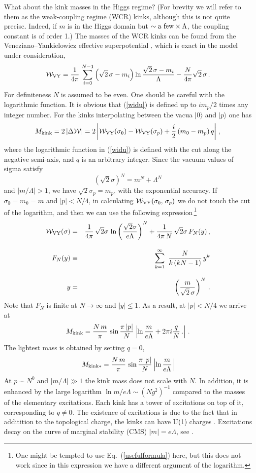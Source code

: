 \documentclass[epsfig,12pt]{article}
\def\beq{\begin{equation}}
\def\eeq{\end{equation}}
\def\beqn{\begin{eqnarray}}
\def\eeqn{\end{eqnarray}}
\newcommand{\cw}{{\mathcal W}}
\def\beqn{\begin{eqnarray}}
\def\eeqn{\end{eqnarray}}
\def\beq{\begin{equation}}
\def\eeq{\end{equation}}
\begin{document}
{What about the kink masses in the Higgs regime? (For brevity we will refer to them as
the weak-coupling regime (WCR) kinks, although this is not quite precise.
Indeed, if $m$ is in the Higgs domain but $\sim {\rm a\,\, few}\times\Lambda$, the coupling constant is 
of order 1.) The masses of the WCR
kinks
can be found from the Veneziano--Yankielowicz
effective superpotential \cite{HaHo},
which is exact in the model under consideration,
\beq
\cw_{\rm VY} 
=
 \frac{1}{4\pi}
\,\sum_{i=0}^{N-1}\left(\sqrt{2}\,\sigma -m_i
\right)\ln\frac{\sqrt{2}\,\sigma -m_i}{\Lambda}-\frac{N}{4\pi}\sqrt{2}\,\sigma\,.
\label{widu}
\eeq
For definiteness $N$ is assumed to be even.
One should be careful with the logarithmic function. It is obvious that (\ref{widu})
is defined up to $im_p/2$ times any integer number.
For the kinks interpolating between the  vacua $|0\rangle$ and  $|p\rangle$  one has \cite{HaHo}
\beq
M_{\rm kink} 
=
 2\left|\Delta \cw\right|= 2\left|\cw_{\rm VY} (\sigma_0) - \cw_{\rm VY} (\sigma_p)+\frac{i}{2}\left(m_0-m_p\right) q  \right|\,,
   \label{widup}
\eeq
where the logarithmic function in (\ref{widu}) is defined with the cut along the negative semi-axis, and $q$ is an arbitrary integer.
Since the vacuum values of sigma satisfy
$$(\sqrt{2}\sigma)^N = m^N + \Lambda^N$$ and $|m/\Lambda| >1$, we 
have $\sqrt{2}\sigma_p = m_p$, with the exponential accuracy.
If  $\sigma_0=m_0=m$ and $|p|<N/4$, in calculating  $\cw_{\rm VY} (\sigma_0, \,\sigma_p)$
we do not touch the cut of the logarithm, and then we can use the following expression\,\footnote{One might be tempted to use Eq.~(\ref{usefulformula}) here, but this does not work
since in this expression we have a different argument of the logarithm.}
\beqn
\cw_{\rm VY}(\sigma)
&=&
  \frac{1}{4\pi}\,\sqrt{2}\sigma\,   \ln\left(\frac{\sqrt{2}\sigma}{e\Lambda}\right)^N
+\frac{1}{4\pi\,N }\,\sqrt{2}\sigma\,F_N(y)\,,
\nonumber\\[3mm]
F_N(y) 
&\equiv&
 \sum_{k=1}^\infty \,\,\frac{N}{k\, (kN-1)}\, y^k
\nonumber\\[3mm]
 y 
&=& 
\left(\frac{m}{\sqrt{2}\,\sigma}\right)^N\,.
\label{chet1}
\eeqn
Note that $F_N$ is finite at $N\to \infty$ and $|y|\leq 1$. 
As a result, at  $|p|<N/4$ we arrive at
\beq
M_{\rm kink} 
=
\frac{N\,m}{\pi}\,\sin\frac{\pi\, |p|}{N}\left|\ln\frac{m}{e\Lambda} +2\pi i\frac{q}{N}\,.
\right|\,.
\label{chet4}
\eeq
The lightest mass is obtained by setting $q=0$,
\beq
M_{{\rm kink}*} 
=
\frac{N\,m}{\pi}\,\sin\frac{\pi\, |p|}{N}\left|\ln\frac{m}{e\Lambda} 
\right|
\label{chet4w}
\eeq
At $p\sim N^0$ and
$|m/\Lambda |\gg1$ the kink mass does not scale with $N$. In addition,  it is enhanced by 
the large logarithm $\ln m/e\Lambda\sim (Ng^2)^{-1}$ compared to the masses of the elementary excitations.
Each kink has a tower of excitations on top of it, corresponding to $q\neq 0$.
The existence of excitations is due to the fact that
in additition to  the topological charge, the kinks can  have U(1) charges \cite{Dor}. 
Excitations decay on the curve of marginal stability (CMS) $|m| =e\Lambda$, see \cite{Olmez}.


}
\end{document}
